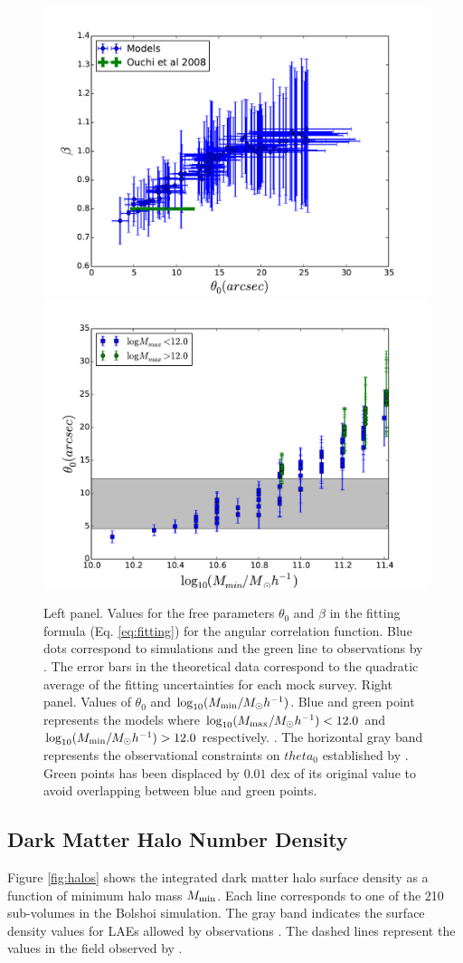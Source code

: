 \documentclass{emulateapj}
\begin{document}
\begin{figure}
\begin{center}
\includegraphics[width=0.46\linewidth,angle=0]{Fig7_corr_params.pdf}  
\includegraphics[width=0.46\linewidth,angle=0]{Fig7_mmin_vs_theta.pdf} 
\end{center}
\caption{Left panel. Values for the free parameters $\theta_{0}$ and $\beta$
in the fitting formula (Eq. \ref{eq:fitting}) for the angular
correlation function. Blue dots correspond to simulations and the
green line to observations by \citet{Ouchi2008,Ouchi2010}. The error
bars in the theoretical data correspond to the quadratic average of
the fitting uncertainties for each mock survey. Right panel. Values of
$\theta_{0}$  and $\log_{10}(M_{\rm min}/M_{\odot} h^{-1})$. Blue and
green point represents the models where  $\log_{10}(M_{\rm max}/M_{\odot}
h^{-1})<12.0$ and  $\log_{10}(M_{\rm min}/M_{\odot} h^{-1})>12.0$
respectively. .  The horizontal gray band represents the observational
constraints on $theta_{0}$ established by
\citet{Ouchi2008,Ouchi2010}. Green points has been displaced by
$0.01$ dex of its original value to avoid overlapping between blue and
green points.} \label{fig:correlation_parameters}   
\end{figure}


\subsection{Dark Matter Halo Number Density}

Figure \ref{fig:halos} shows the  integrated dark matter halo surface
density as a function of  minimum halo mass $M_{\rm min}$. Each line
corresponds to one of the 210 sub-volumes in the Bolshoi
simulation. The gray band indicates the surface density values for
LAEs allowed by observations \citep{Yamada2012}. The dashed lines
represent the values in the field observed by
\citep{Ouchi2008}. 
\end{document}
